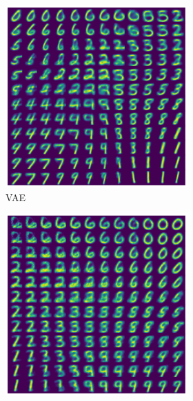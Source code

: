 \begin{figure}[!h]
	\begin{subfigure}[t]{0.60\textwidth}
		\begin{subfigure}[t]{0.49\textwidth}
			\centering
			\includegraphics[width = 1\textwidth]{figures/vae/interpolation}
			\caption{VAE}
			\label{fig:vae:interpolation}
		\end{subfigure}
		\begin{subfigure}[t]{0.49\textwidth}
			\centering
			\includegraphics[width = 1\textwidth]{figures/cvae/interpolation}

\end{subfigure}
\end{subfigure}
\end{figure}
